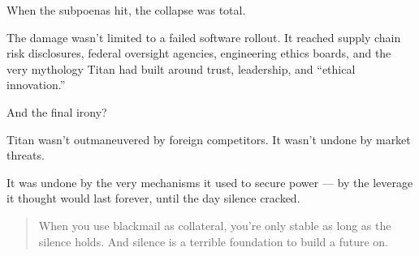 \medskip

When the subpoenas hit, the collapse was total.

The damage wasn’t limited to a failed software rollout.
It reached supply chain risk disclosures, federal oversight agencies, engineering ethics boards, and the very mythology Titan had built around trust, leadership, and “ethical innovation.”

And the final irony?

Titan wasn’t outmaneuvered by foreign competitors.
It wasn’t undone by market threats.

It was undone by the very mechanisms it used to secure power —
by the leverage it thought would last forever,
until the day silence cracked.

\begin{quote}
    When you use blackmail as collateral,
    you’re only stable as long as the silence holds.
    And silence is a terrible foundation to build a future on.
\end{quote}

